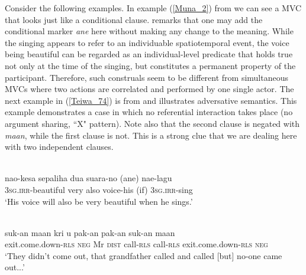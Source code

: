 Consider the following examples. In example (\ref{Muna_2}) from  we can see a MVC that looks just like a conditional clause. \citet{vandenberg1989} remarks that one may add the conditional marker \textit{ane} here without making any change to the meaning. While the singing appears to refer to an individuable spatiotemporal event, the voice being beautiful can be regarded as an individual-level predicate that holds true not only at the time of the singing, but constitutes a permanent property of the participant. Therefore, such construals seem to be different from simultaneous MVCs where two actions are correlated and performed by one single actor. The next example in (\ref{Teiwa_74}) is from  and illustrates adversative semantics. This example  demonstrates a case in which no referential interaction takes place (no argument sharing, ``X" pattern). Note also that the second clause is negated with \textit{maan}, while the first clause is not. This is a strong clue that we are dealing here with two independent clauses.

\ea \label{Muna_2}
\\
\gll nao-kesa sepaliha dua suara-no (ane) nae-lagu \\
3\textsc{sg}.\textsc{irr}-beautiful very also voice-his (if) 3\textsc{sg}.\textsc{irr}-sing \\
\glft `His voice will also be very beautiful when he sings.'\\ 
\z

\ea \label{Teiwa_74}
\\
\gll suk-an maan kri u pak-an pak-an suk-an maan \\
exit.come.down-\textsc{rls} \textsc{neg} Mr \textsc{dist} call-\textsc{rls} call-\textsc{rls} exit.come.down-\textsc{rls} \textsc{neg} \\
\glft `They didn't come out, that grandfather called and called [but] no-one came out...'\\ 
\z

